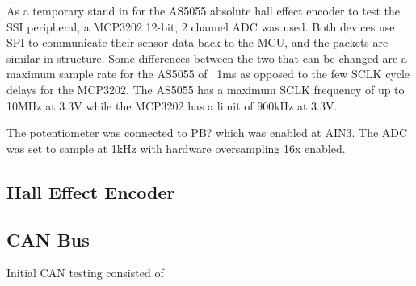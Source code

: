 As a temporary stand in for the AS5055 absolute hall effect encoder to test the SSI peripheral, a MCP3202 12-bit, 2 channel ADC was used. Both devices use SPI to communicate their sensor data back to the MCU, and the packets are similar in structure. Some differences between the two that can be changed are a maximum sample rate for the AS5055 of ~1ms as opposed to the few SCLK cycle delays for the MCP3202. The AS5055 has a maximum SCLK frequency of up to 10MHz at 3.3V while the MCP3202 has a limit of 900kHz at 3.3V. 

The potentiometer was connected to PB? which was enabled at AIN3. The ADC was set to sample at 1kHz with hardware oversampling 16x enabled. 
\subsection{Hall Effect Encoder}
\subsection{CAN Bus}
Initial CAN testing consisted of 
